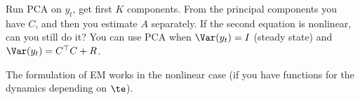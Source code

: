 Run PCA on $y_t$, get first $K$ components. 
From the principal components you have $C$, and then you estimate $A$ separately.
If the second equation is nonlinear, can you still do it?
You can use PCA when $\Var(y_t)=I$ (steady state) %
and $\Var(y_t)=C^\top  C + R$.

The formulation of EM works in the nonlinear case (if you have functions for the dynamics depending on $\te$).


